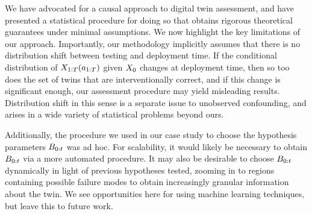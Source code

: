 We have advocated for a causal approach to digital twin assessment, and have presented a statistical procedure for doing so that obtains rigorous theoretical guarantees under minimal assumptions.
We now highlight the key limitations of our approach.
Importantly, our methodology implicitly assumes that there is no distribution shift between testing and deployment time.
If the conditional distribution of $X_{1:T}(a_{1:T})$ given $X_0$ changes at deployment time, then so too does the set of twins that are interventionally correct, and if this change is significant enough, our assessment procedure may yield misleading results.
Distribution shift in this sense is a separate issue to unobserved confounding, and arises in a wide variety of statistical problems beyond ours.

Additionally, the procedure we used in our case study to choose the hypothesis parameters $B_{0:t}$ was ad hoc.
For scalability, it would likely be necessary to obtain $B_{0:t}$ via a more automated procedure.
It may also be desirable to choose $B_{0:t}$ dynamically in light of previous hypotheses tested, zooming in to regions containing possible failure modes to obtain increasingly granular information about the twin.
We see opportunities here for using machine learning techniques, but leave this to future work.

